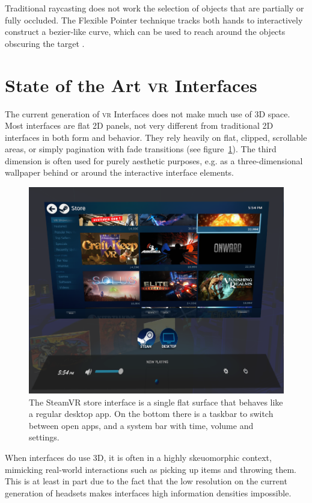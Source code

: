 \documentclass[nobib]{tufte-book} %
\begin{document}
Traditional raycasting does not work the selection of objects that are partially or fully occluded. The Flexible Pointer technique tracks both hands to interactively construct a bezier-like curve, which can be used to reach around the objects obscuring the target \cite{feiner2003flexible}.

\section{State of the Art \textsc{vr} Interfaces}
The current generation of \textsc{vr} Interfaces does not make much use of 3D space. Most interfaces are flat 2D panels, not very different from traditional 2D interfaces in both form and behavior. They rely heavily on flat, clipped, scrollable areas, or simply pagination with fade transitions (see figure~\ref{fig:steamstore}). The third dimension is often used for purely aesthetic purposes, e.g. as a three-dimensional wallpaper behind or around the interactive interface elements.

\begin{figure}
  \includegraphics{steamstore.png}
  \caption{The SteamVR store interface is a single flat surface that behaves like a regular desktop app. On the bottom there is a taskbar to switch between open apps, and a system bar with time, volume and settings.}
  \label{fig:steamstore}
\end{figure}

When interfaces do use 3D, it is often in a highly skeuomorphic context, mimicking real-world interactions such as picking up items and throwing them.
This is at least in part due to the fact that the low resolution on the current generation of headsets makes interfaces high information densities impossible.
\end{document}
